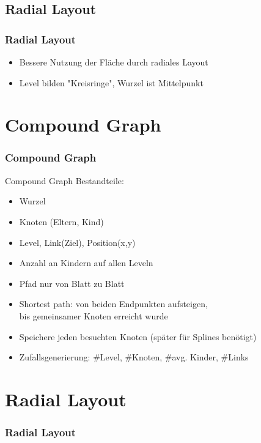 \documentclass[11pt]{beamer}
\begin{document}
\subsection{Radial Layout}
\begin{frame}
\frametitle{Radial Layout}

\begin{itemize}
\item Bessere Nutzung der Fläche durch radiales Layout
\item Level bilden "Kreisringe", Wurzel ist Mittelpunkt
\end{itemize}

\section{Compound Graph}
\begin{frame}[allowframebreaks]
\frametitle{Compound Graph}

Compound Graph Bestandteile:
\begin{itemize} 
\item Wurzel
\item Knoten (Eltern, Kind)                                                                                                                       
\item Level, Link(Ziel), Position(x,y)
\item Anzahl an Kindern auf allen Leveln
\end{itemize}

\framebreak
\begin{itemize} 
\item Pfad nur von Blatt zu Blatt
\item Shortest path: von beiden Endpunkten aufsteigen, \\ bis gemeinsamer Knoten erreicht wurde
\item Speichere jeden besuchten Knoten (später für Splines benötigt)
\item Zufallsgenerierung: \#Level, \#Knoten, \#avg. Kinder, \#Links
\end{itemize}


\end{frame}


\section{Radial Layout}
\begin{frame}
\frametitle{Radial Layout}


\end{frame}
\end{frame}
\end{document}
